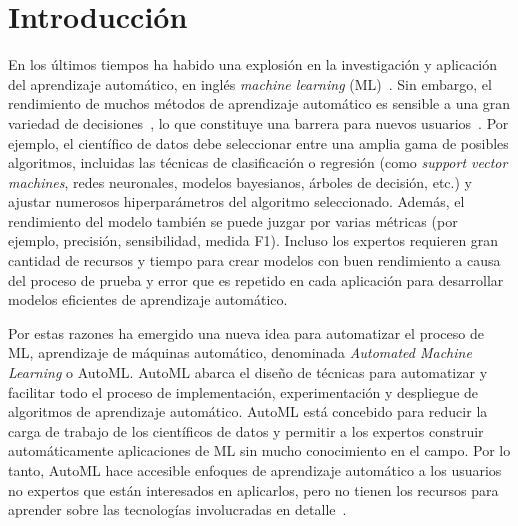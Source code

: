 \documentclass[a4paper,10pt,twocolumn]{article}
\begin{document}
\section{Introducción}\label{sec:intro}
En los últimos tiempos ha habido una explosión en la investigación y aplicación del aprendizaje automático, en inglés \textit{machine learning} (ML)~\cite{hey2020machinelearning}. Sin embargo, el rendimiento de muchos métodos de aprendizaje automático es sensible a una gran variedad de decisiones~\cite{dyrmishi2019decision, radwa2019automated}, lo que constituye una barrera para nuevos usuarios~\cite{crisan2021fits}. Por ejemplo, el científico de datos debe seleccionar entre una amplia gama de posibles algoritmos, incluidas las técnicas de clasificación o regresión (como \textit{support vector machines}, redes neuronales, modelos bayesianos, árboles de decisión, etc.) y ajustar numerosos hiperparámetros del algoritmo seleccionado. Además, el rendimiento del modelo también se puede juzgar por varias métricas (por ejemplo, precisión, sensibilidad, medida F1). Incluso los expertos requieren gran cantidad de recursos y tiempo para crear modelos con buen rendimiento a causa del proceso de prueba y error que es repetido en cada aplicación para desarrollar modelos eficientes de aprendizaje automático.

Por estas razones ha emergido una nueva idea para automatizar el proceso de ML, aprendizaje de máquinas automático, denominada \textit{Automated Machine Learning} o AutoML. AutoML abarca el diseño de técnicas para automatizar y facilitar todo el proceso de implementación, experimentación y despliegue de algoritmos de aprendizaje automático. AutoML está concebido para reducir la carga de trabajo de los científicos de datos y permitir a los expertos construir automáticamente aplicaciones de ML sin mucho conocimiento en el campo. Por lo tanto, AutoML hace accesible enfoques de aprendizaje automático a los usuarios no expertos que están interesados en aplicarlos, pero no tienen los recursos para aprender sobre las tecnologías involucradas en detalle~\cite{hutter2019autmlbook}.
\end{document}
